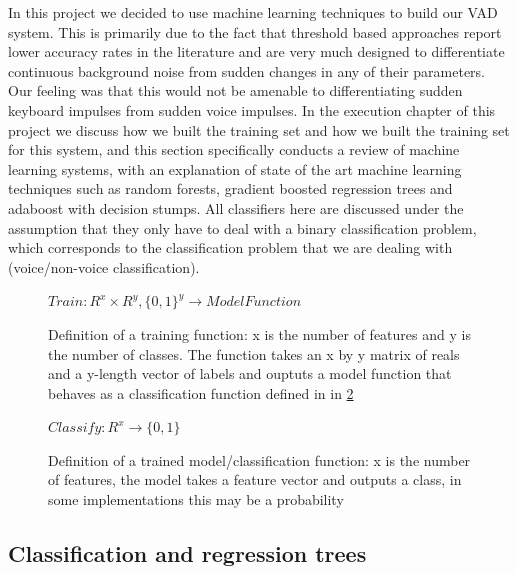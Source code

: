 \documentclass[ %
                    author={Sam Phippen},
                supervisor={Dr. Rafal Bogacz},
                     title={Real time voice activity detectors in noisy personal computing environments},
                  subtitle={},
                    degree={MEng},
                      year={2012} ]{thesis}
\begin{document}
In this project we decided to use machine learning techniques to build our VAD
system. This is primarily due to the fact that threshold based approaches
report lower accuracy rates in the literature and are very much designed to
differentiate continuous background noise from sudden changes in any of their
parameters. Our feeling was that this would not be amenable to differentiating
sudden keyboard impulses from sudden voice impulses. In the execution chapter
of this project we discuss how we built the training set and how we built the
training set for this system, and this section specifically conducts a review
of machine learning systems, with an explanation of state of the art machine
learning techniques such as random forests, gradient boosted regression trees
and adaboost with decision stumps. All classifiers here are discussed under the
assumption that they only have to deal with a binary classification problem,
which corresponds to the classification problem that we are dealing with
(voice/non-voice classification).

\begin{figure}
    $Train:R^x \times R^y, \{0,1\}^y \rightarrow ModelFunction$

    \caption{Definition of a training function: x is the number of features and
        y is the number of classes. The function takes an x by y matrix of
        reals and a y-length vector of labels and ouptuts a model function that
        behaves as a classification function defined in in
    \ref{eqn:define-classify} }

    \label{eqn:define-train}
\end{figure}

\begin{figure}
    $Classify: R^x \rightarrow \{0,1\}$
    \caption{Definition of a trained model/classification function: x is the
        number of features, the model takes a feature vector and outputs a class,
    in some implementations this may be a probability}
    \label{eqn:define-classify}
\end{figure}

\subsection{Classification and regression trees}
\end{document}
